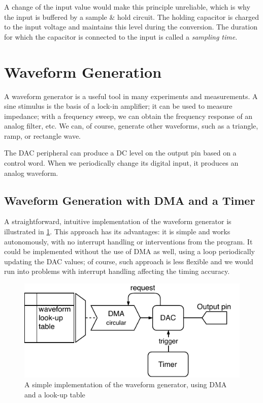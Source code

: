 A change of the input value would make this principle unreliable, which is why the input is buffered by a sample \& hold circuit. The holding capacitor is charged to the input voltage and maintains this level during the conversion. The duration for which the capacitor is connected to the input is called a \textit{sampling time}.

\section{Waveform Generation} \label{sec:theory_dac}

A waveform generator is a useful tool in many experiments and measurements. A sine stimulus is the basis of a lock-in amplifier; it can be used to measure impedance; with a frequency sweep, we can obtain the frequency response of an analog filter, etc. We can, of course, generate other waveforms, such as a triangle, ramp, or rectangle wave.

The \gls{DAC} peripheral can produce a \gls{DC} level on the output pin based on a control word. When we periodically change its digital input, it produces an analog waveform.

\subsection{Waveform Generation with DMA and a Timer} \label{sec:theory_dac_simple}

A straightforward, intuitive implementation of the waveform generator is illustrated in \cref{fig:wavegen_naive}. This approach has its advantages: it is simple and works autonomously, with no interrupt handling or interventions from the program. It could be implemented without the use of \gls{DMA} as well, using a loop periodically updating the \gls{DAC} values; of course, such approach is less flexible and we would run into problems with interrupt handling affecting the timing accuracy.

\begin{figure}[h]
	\centering
	\includegraphics[scale=1.1] {img/wavegen-naive.pdf}
	\caption[A simple implementation of the waveform generator]{\label{fig:wavegen_naive}A simple implementation of the waveform generator, using DMA and a look-up table}
\end{figure}


